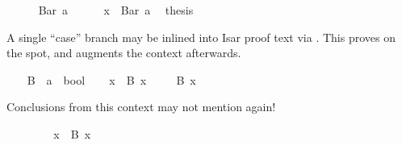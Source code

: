 \begin{isabellebody}
\isanewline
\ \ \ \ \isamarkupfalse%
\ {}Bar\ a{}\isanewline
\ \ \ \ \isamarkupfalse%
\ {}x\ {}\ Bar\ a{}\ \isamarkupfalse%
\ {}thesis\ \isamarkupfalse%
\isanewline
\ \ \isamarkupfalse%
%
\endisatagproof
{\isafoldproof}%
%
\isadelimproof
\isanewline
%
\endisadelimproof
{}\isamarkupfalse%
%
\isamarkuptrue%
%
\begin{isamarkuptext}%
A single ``case'' branch may be inlined into Isar proof text
  via \hyperlink{command.obtain}{\mbox{}}.  This proves  on the spot, and augments the context afterwards.%
\end{isamarkuptext}%
\isamarkuptrue%
\isamarkupfalse%
\isanewline
{}\isanewline
%
\isadelimproof
\ \ %
\endisadelimproof
%
\isatagproof
{}\isamarkupfalse%
\ B\ {}{}\ {}{}a\ {}\ bool{}\isanewline
\isanewline
\ \ \isamarkupfalse%
\ x\ \ {}B\ x{}\ \isamarkupfalse%
\isanewline
\ \ \isamarkupfalse%
\ {}B\ x{}%
\begin{isamarkuptxt}%
Conclusions from this context may not mention  again!%
\end{isamarkuptxt}%
\isamarkuptrue%
\ \ \isamarkupfalse%
\isanewline
\ \ \ \ \isamarkupfalse%
\ x\ \ {}B\ x{}\ \isamarkupfalse%

\end{isabellebody}
